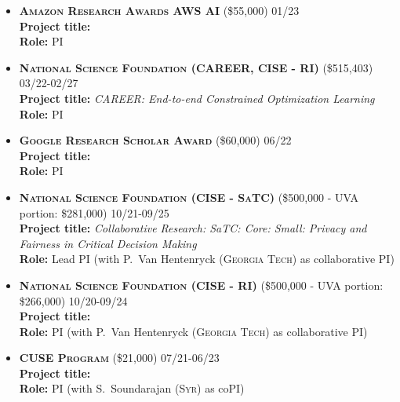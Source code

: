 \begin{itemize}
	\item
	\textbf{\textsc{Amazon Research Awards AWS AI}}
	(\$55,000)
	\hfill\textsc{01/23}\\
	{\bf Project title:} \\
	{\bf Role:} PI

	\item
	\textbf{\textsc{National Science Foundation (CAREER, CISE - RI)}}
	(\$515,403)
	\hfill\textsc{03/22-02/27}\\
	{\bf Project title:} 
	{\em CAREER: End-to-end Constrained Optimization Learning}\\
	{\bf Role:} PI

	\item
	\textbf{\textsc{Google Research Scholar Award}}
	(\$60,000)
	\hfill\textsc{06/22}\\
	{\bf Project title:} \\
	{\bf Role:} PI

	\item
	\textbf{\textsc{National Science Foundation (CISE - SaTC)}}
	(\$500,000 - UVA portion: \$281,000)
	\hfill\textsc{10/21-09/25}\\
	{\bf Project title:} 
	{\em Collaborative Research: SaTC: Core: Small: Privacy and Fairness in Critical Decision Making}\\
	{\bf Role:} Lead PI (with P.~Van Hentenryck (\textsc{Georgia Tech}) as collaborative PI)

	\item
	\textbf{\textsc{National Science Foundation (CISE - RI)}}
	(\$500,000 - UVA portion: \$266,000)
	\hfill\textsc{10/20-09/24}\\
	{\bf Project title:} 
	\\
	{\bf Role:} PI (with P.~Van Hentenryck (\textsc{Georgia Tech}) as collaborative PI)

	\item
	\textbf{\textsc{CUSE Program}}
	(\$21,000)
	\hfill\textsc{07/21-06/23}\\
	{\bf Project title:} \\
	{\bf Role:} PI (with S.~Soundarajan (\textsc{Syr}) as coPI)	
\end{itemize}

